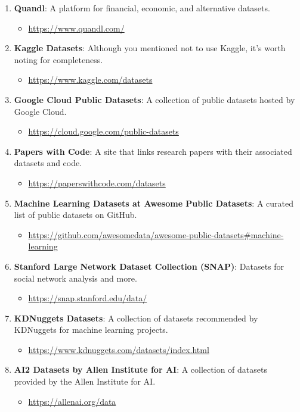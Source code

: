 \documentclass{article}
\begin{document}
\begin{enumerate}
    \item \textbf{Quandl}: A platform for financial, economic, and alternative datasets.
    \begin{itemize}
        \item \url{https://www.quandl.com/}
    \end{itemize}

    \item \textbf{Kaggle Datasets}: Although you mentioned not to use Kaggle, it's worth noting for completeness.
    \begin{itemize}
        \item \url{https://www.kaggle.com/datasets}
    \end{itemize}

    \item \textbf{Google Cloud Public Datasets}: A collection of public datasets hosted by Google Cloud.
    \begin{itemize}
        \item \url{https://cloud.google.com/public-datasets}
    \end{itemize}

    \item \textbf{Papers with Code}: A site that links research papers with their associated datasets and code.
    \begin{itemize}
        \item \url{https://paperswithcode.com/datasets}
    \end{itemize}

    \item \textbf{Machine Learning Datasets at Awesome Public Datasets}: A curated list of public datasets on GitHub.
    \begin{itemize}
        \item \url{https://github.com/awesomedata/awesome-public-datasets#machine-learning}
    \end{itemize}

    \item \textbf{Stanford Large Network Dataset Collection (SNAP)}: Datasets for social network analysis and more.
    \begin{itemize}
        \item \url{https://snap.stanford.edu/data/}
    \end{itemize}

    \item \textbf{KDNuggets Datasets}: A collection of datasets recommended by KDNuggets for machine learning projects.
    \begin{itemize}
        \item \url{https://www.kdnuggets.com/datasets/index.html}
    \end{itemize}

    \item \textbf{AI2 Datasets by Allen Institute for AI}: A collection of datasets provided by the Allen Institute for AI.
    \begin{itemize}
        \item \url{https://allenai.org/data}
    \end{itemize}
\end{enumerate}
\end{document}
